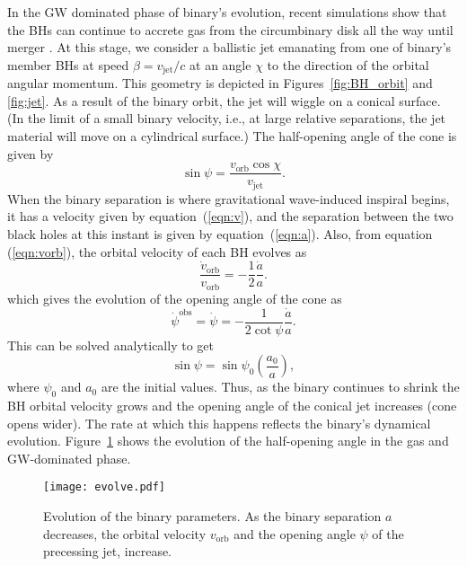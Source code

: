 \documentclass[iop]{emulateapj}
\begin{document}
In the GW dominated phase of binary's evolution, recent simulations
show that the BHs can continue to accrete gas from the circumbinary
disk all the way until merger \citep{2015MNRAS.446L..36F}.  At this
stage, we consider a ballistic jet emanating from one of binary's
member BHs at speed $\beta=v_\mathrm{jet}/c$ at an angle $\chi$ to the
direction of the orbital angular momentum.  This geometry is depicted
in Figures~\ref{fig:BH_orbit} and \ref{fig:jet}.  As a result of the
binary orbit, the jet will wiggle on a conical surface.  (In the limit
of a small binary velocity, i.e., at large relative separations, the
jet material will move on a cylindrical surface.)  The half-opening
angle of the cone is given by \citep{1993ApJ...409..130R}
\begin{equation}
  \sin\psi = \frac{v_\mathrm{orb}\cos\chi}{v_\mathrm{jet}}.
\end{equation}
When the binary separation is where gravitational wave-induced
inspiral begins, it has a velocity given by equation~(\ref{eqn:v}),
and the separation between the two black holes at this instant is
given by equation~(\ref{eqn:a}).  Also, from equation
(\ref{eqn:vorb}), the orbital velocity of each BH evolves as
\begin{equation}
  \frac{\dot v_\mathrm{orb}}{v_\mathrm{orb}} = -\frac{1}{2}\frac{\dot a}{a}.
\end{equation}
which gives the evolution of the opening angle of the cone as 
\begin{equation}
  \dot\psi^\mathrm{obs}=\dot\psi = -\frac{1}{2\cot\psi}\frac{\dot a}{a}.
\end{equation}
This can be solved analytically to get
\begin{equation}
  \sin\psi = \sin\psi_0\left(\frac{a_0}{a}\right),
\end{equation}
where $\psi_0$ and $a_0$ are the initial values. Thus, as the binary
continues to shrink the BH orbital velocity grows and the opening
angle of the conical jet increases (cone opens wider).  The rate at
which this happens reflects the binary's dynamical evolution.
Figure~\ref{fig:evolve} shows the evolution of the half-opening angle
in the gas and GW-dominated phase.

\begin{figure}
  \begin{center}
    \texttt{[image: evolve.pdf]}
  \end{center}
  \caption{Evolution of the binary parameters.  As the binary
    separation $a$ decreases, the orbital velocity $v_\mathrm{orb}$
    and the opening angle $\psi$ of the precessing jet, increase.}
  \label{fig:evolve}
\end{figure}
\end{document}
